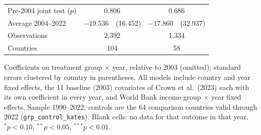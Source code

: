\begin{table}[htbp]
\begin{tabular}{lcccc}
\midrule
Pre-2004 joint test ($p$) & \multicolumn{2}{c}{0.806} & \multicolumn{2}{c}{0.686} \\
Average 2004--2022 & $-19.536$ & (16.452) & $-17.860$ & (32.937) \\
Observations & \multicolumn{2}{c}{2,392} & \multicolumn{2}{c}{1,334} \\
Countries & \multicolumn{2}{c}{104} & \multicolumn{2}{c}{58} \\
\bottomrule
\end{tabular}
\par\vspace{4pt}
\begin{minipage}{\textwidth}\footnotesize Coefficients on treatment group $\times$ year, relative to 2003 (omitted); standard errors clustered by country in parentheses. All models include country and year fixed effects, the 11 baseline (2003) covariates of Crown et al.\ (2023) each with its own coefficient in every year, and World Bank income group $\times$ year fixed effects. Sample 1990--2022; controls are the 64 comparison countries valid through 2022 (\texttt{grp\_control\_kates}). Blank cells: no data for that outcome in that year. $^{*}p<0.10$, $^{**}p<0.05$, $^{***}p<0.01$.\end{minipage}
\end{table}
